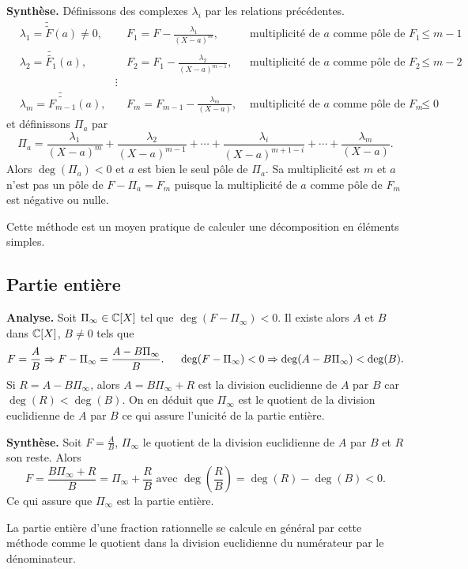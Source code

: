 \textbf{Synthèse.}\newline
Définissons des complexes $\lambda_i$ par les relations précédentes.
\begin{align*}
 &\lambda_1 = \widetilde{\widetilde{F}}(a)\neq 0,& &F_1 = F -\frac{\lambda_1}{(X-a)^m},   &\text{ multiplicité de $a$ comme pôle de $F_1$ } \leq m-1\\
 &\lambda_2 = \widetilde{\widetilde{F_1}}(a),& &F_2 = F_1 -\frac{\lambda_2}{(X-a)^{m-1}}, &\text{ multiplicité de $a$ comme pôle de $F_2$ } \leq m-2\\
&  & \vdots & & \\
&\lambda_m = \widetilde{\widetilde{F_{m-1}}}(a),& &F_m = F_{m-1} -\frac{\lambda_m}{(X-a)}, &\text{ multiplicité de $a$ comme pôle de $F_m$ } \leq 0
\end{align*}
et définissons $\Pi_a$ par
\[
 \Pi_a = \frac{\lambda_1}{(X-a)^m}+\frac{\lambda_2}{(X-a)^{m-1}}+\cdots +\frac{\lambda_i}{(X-a)^{m+1-i}}+\cdots+ \frac{\lambda_m}{(X-a)}.
\]
Alors $\deg(\Pi_a) < 0$ et $a$ est bien le seul pôle de $\Pi_a$. Sa multiplicité est $m$ et $a$ n'est pas un pôle de $F - \Pi_a = F_m$ puisque la multiplicité de $a$ comme pôle de $F_m$ est négative ou nulle.

\begin{rem}
 Cette méthode est un moyen pratique de calculer une décomposition en éléments simples.
\end{rem}

\subsection{Partie entière}
\label{pent}

\textbf{Analyse.}\newline
Soit $\Pi_\infty \in \mathbb{C}[X]$ tel que $\deg(F - \Pi_\infty) < 0$. Il existe alors $A$ et $B$ dans $\mathbb{C}[X]$, $B\neq 0$ tels que
\[
 F= \frac{A}{B} 
 \Rightarrow F - \Pi_\infty = \frac{A - B \Pi_\infty}{B}.\hspace{0.5cm}
 \deg(F - \Pi_\infty) < 0 \Rightarrow \deg(A - B \Pi_\infty) < \deg(B).
\]
Si $R = A - B \Pi_\infty$, alors $A = B \Pi_\infty + R$ est la division euclidienne de $A$ par $B$ car $\deg(R) < \deg(B)$. On en déduit que $\Pi_\infty$ est le quotient de la division euclidienne de $A$ par $B$ ce qui assure l'unicité de la partie entière. 

\textbf{Synthèse.}\newline
Soit $F=\frac{A}{B}$, $\Pi_\infty$ le quotient de la division euclidienne de $A$ par $B$ et $R$ son reste. Alors
\[
 F = \frac{B\Pi_\infty + R}{B} = \Pi_\infty + \frac{R}{B} \text{ avec }
 \deg(\frac{R}{B}) = \deg(R) - \deg(B) < 0.
\]
Ce qui assure que $\Pi_\infty$ est la partie entière.
\begin{rem}
 La partie entière d'une fraction rationnelle se calcule en général par cette méthode comme le quotient dans la division euclidienne du numérateur par le dénominateur.
\end{rem}

